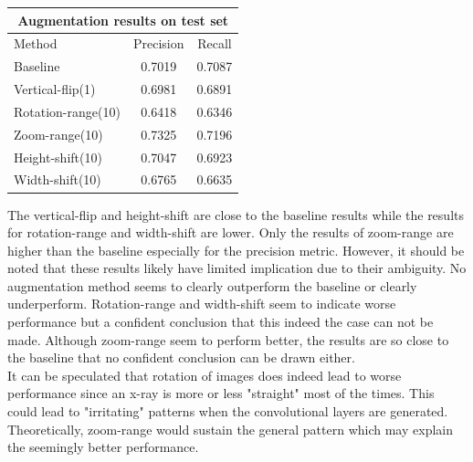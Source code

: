 \begin{table}[h]
\centering
\begin{tabular}{ |p{3cm}|c|c|  }
 \hline
 \multicolumn{3}{|c|}{Augmentation results on test set} \\
 \hline
 Method & Precision & Recall\\
 \hline
 Baseline & 0.7019 & 0.7087\\
 Vertical-flip(1) & 0.6981 & 0.6891\\
 Rotation-range(10) & 0.6418 & 0.6346\\
 Zoom-range(10) & 0.7325 & 0.7196\\
 Height-shift(10) & 0.7047 & 0.6923\\
 Width-shift(10) & 0.6765 & 0.6635\\
 \hline
\end{tabular}
\end{table}

The vertical-flip and height-shift are close to the baseline results while the results for rotation-range and width-shift are lower. Only the results of zoom-range are higher than the baseline especially for the precision metric. However, it should be noted that these results likely have limited implication due to their ambiguity. No augmentation method seems to clearly outperform the baseline or clearly underperform. Rotation-range and width-shift seem to indicate worse performance but a confident conclusion that this indeed the case can not be made. Although zoom-range seem to perform better, the results are so close to the baseline that no confident conclusion can be drawn either. \\
It can be speculated that rotation of images does indeed lead to worse performance since an x-ray is more or less "straight" most of the times. This could lead to "irritating" patterns when the convolutional layers are generated. Theoretically, zoom-range would sustain the general pattern which may explain the seemingly better performance.






